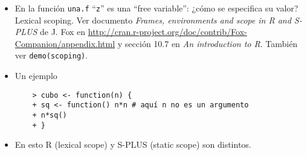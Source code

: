 \begin{itemize}
    \item En la función \verb"una.f" ``\verb"z"'' es una ``free variable'':
    ¿cómo se especifica su valor? Lexical scoping. Ver documento
    \emph{Frames, environments and scope in R and S-PLUS} de J. Fox en
    \url{http://cran.r-project.org/doc/contrib/Fox-Companion/appendix.html}
    y sección 10.7 en \emph{An introduction to R}.
    También ver \verb"demo(scoping)".

    \item Un ejemplo
    \begin{verbatim}
    > cubo <- function(n) {
    + sq <- function() n*n # aquí n no es un argumento
    + n*sq()
    + }
    \end{verbatim}

    \item En esto R (lexical scope) y S-PLUS (static scope) son distintos.
\end{itemize}

\newslide

